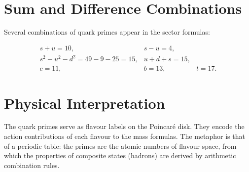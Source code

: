 \section{Sum and Difference Combinations}

Several combinations of quark primes appear in the sector formulas:

\[
\begin{array}{lcl}
s+u = 10, & s-u = 4, \\
s^2 - u^2 - d^2 = 49 - 9 - 25 = 15, & u+d+s = 15, \\
c = 11, & b = 13, & t = 17.
\end{array}
\]

\section{Physical Interpretation}

The quark primes serve as flavour labels on the Poincar\'{e} disk.  They
encode the action contributions of each flavour to the mass formulas.  The
metaphor is that of a periodic table: the primes are the atomic numbers of
flavour space, from which the properties of composite states (hadrons) are
derived by arithmetic combination rules.
